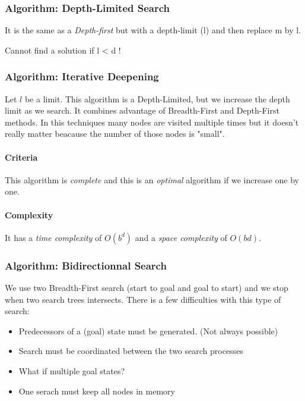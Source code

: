 \subsubsection{Algorithm: Depth-Limited Search}

It is the same as a \textit{Depth-first} but with a depth-limit (l) and
then replace m by l.

Cannot find a solution if l < d !

\subsubsection{Algorithm: Iterative Deepening}

Let $l$ be  a limit. This algorithm is a  Depth-Limited, but we increase
the depth limit as we search. It combines advantage of Breadth-First and
Depth-First methods. In this techniques  many nodes are visited multiple
times but it doesn't really matter beacause the number of those nodes is
"small".

\paragraph{Criteria} This algorithm is  \textit{complete} and this is an
\textit{optimal} algorithm if we increase one by one.

\paragraph{Complexity} It has a \textit{time complexity} of $O(b^d)$ and
a \textit{space complexity} of $O(bd)$.


\subsubsection{Algorithm: Bidirectionnal Search}

We  use two Breadth-First search (start to goal and goal to start)  and   we  stop  when  two  search  trees
intersects. There is a few difficulties with this type of search:

\begin{itemize}
    \item Predecessors of a (goal) state must be generated. (Not always possible)
    \item Search must be coordinated between the two search processes
    \item What if multiple goal states?
    \item One serach must keep all nodes in memory
\end{itemize} 


